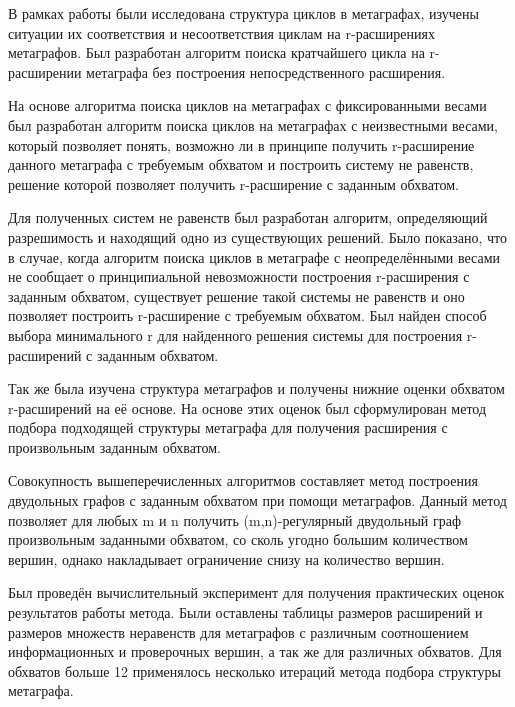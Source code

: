 \documentclass[14pt]{mmcs-article}
\begin{document}
В рамках работы были исследована структура циклов в метаграфах, изучены ситуации их соответствия и несоответствия циклам на r-расширениях метаграфов. Был разработан алгоритм поиска кратчайшего цикла на r-расширении метаграфа без построения непосредственного расширения.

На основе алгоритма поиска циклов на метаграфах с фиксированными весами был разработан алгоритм поиска циклов на метаграфах с неизвестными весами, который позволяет понять, возможно ли в принципе получить r-расширение данного метаграфа с   требуемым обхватом и построить систему не равенств, решение которой позволяет получить r-расширение с заданным обхватом. 

Для полученных систем не равенств был разработан алгоритм, определяющий разрешимость и находящий одно из существующих решений. Было показано, что в случае, когда алгоритм поиска циклов в метаграфе с неопределёнными весами не сообщает о принципиальной невозможности построения r-расширения с заданным обхватом, существует решение такой системы не равенств и оно позволяет построить r-расширение с требуемым обхватом. Был найден способ выбора минимального r для найденного решения системы для построения r-расширений с заданным обхватом. 

Так же была изучена структура метаграфов и получены нижние оценки обхватом r-расширений на её основе. На основе этих оценок был сформулирован метод подбора подходящей структуры метаграфа для получения расширения с произвольным заданным обхватом.

Совокупность вышеперечисленных алгоритмов составляет метод построения двудольных графов с заданным обхватом при помощи метаграфов. Данный метод позволяет для любых m и n получить (m,n)-регулярный двудольный граф произвольным заданными обхватом, со сколь угодно большим количеством вершин, однако накладывает ограничение снизу на количество вершин.

Был проведён вычислительный эксперимент для получения практических оценок результатов работы метода. Были оставлены таблицы размеров расширений и размеров множеств неравенств для метаграфов с различным соотношением информационных и проверочных вершин, а так же для различных обхватов. Для обхватов больше 12 применялось несколько итераций метода подбора структуры метаграфа.  

\newpage

\renewcommand{\refname}{\centering \textbf{Литература}}
\end{document}
